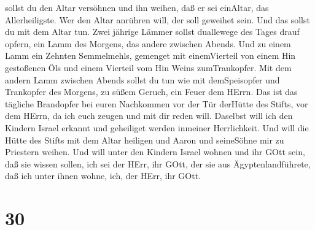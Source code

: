 sollst du den Altar versöhnen und ihn weihen, daß er sei einAltar, das
Allerheiligste. Wer den Altar anrühren will, der soll geweihet sein.
 Und das sollst du mit dem Altar tun. Zwei jährige Lämmer
sollst duallewege des Tages drauf opfern,  ein Lamm des
Morgens, das andere zwischen Abends.  Und zu einem Lamm ein
Zehnten Semmelmehls, gemenget mit einemVierteil von einem Hin gestoßenen
Öls und einem Vierteil vom Hin Weins zumTrankopfer.  Mit
dem andern Lamm zwischen Abends sollst du tun wie mit demSpeisopfer und
Trankopfer des Morgens, zu süßem Geruch, ein Feuer dem HErrn.
 Das ist das tägliche Brandopfer bei euren Nachkommen vor
der Tür derHütte des Stifts, vor dem HErrn, da ich euch zeugen und mit
dir reden will.  Daselbst will ich den Kindern Israel
erkannt und geheiliget werden inmeiner Herrlichkeit.  Und
will die Hütte des Stifts mit dem Altar heiligen und Aaron und
seineSöhne mir zu Priestern weihen.  Und will unter den
Kindern Israel wohnen und ihr GOtt sein,  daß sie wissen
sollen, ich sei der HErr, ihr GOtt, der sie aus Ägyptenlandführete, daß
ich unter ihnen wohne, ich, der HErr, ihr GOtt.

\hypertarget{section-29}{%
\section{30}\label{section-29}}

